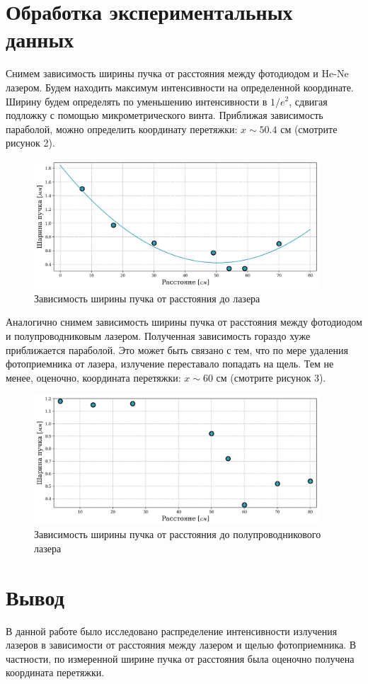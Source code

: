 \documentclass[a4paper, 12pt]{extarticle}
\begin{document}
\section*{\textcolor{header}{Обработка экспериментальных данных}}

Снимем зависимость ширины пучка от расстояния между фотодиодом и He-Ne лазером. Будем находить максимум интенсивности на определенной координате. Ширину будем определять по уменьшению интенсивности в $1/e^2$, сдвигая подложку с помощью микрометрического винта. 
Приближая зависимость параболой, можно определить координату перетяжки:
$x \sim 50.4$ см (смотрите рисунок 2).
\begin{figure}[htbp]
    \centering
    \includegraphics[width = 0.95\textwidth]{red.png}
    \caption{Зависимость ширины пучка от расстояния до лазера}
    \label{fig:1}
\end{figure}

Аналогично снимем зависимость ширины пучка от расстояния между фотодиодом и полупроводниковым  лазером. 
Полученная зависимость гораздо хуже приближается параболой. Это может быть связано с тем, что по мере удаления фотоприемника от лазера, излучение переставало попадать на щель. Тем не менее, оценочно, координата перетяжки:
$x \sim 60$ см (смотрите рисунок 3).

\begin{figure}[htbp]
    \centering
    \includegraphics[width = 0.95\textwidth]{green.png}
    \caption{Зависимость ширины пучка от расстояния до полупроводникового лазера}
    \label{fig:2}
\end{figure}


\section*{\textcolor{header}{Вывод}}

В данной работе было исследовано распределение интенсивности излучения лазеров в зависимости от расстояния между лазером и щелью фотоприемника. В частности, по измеренной ширине пучка от расстояния была оценочно получена координата перетяжки.
\end{document}
